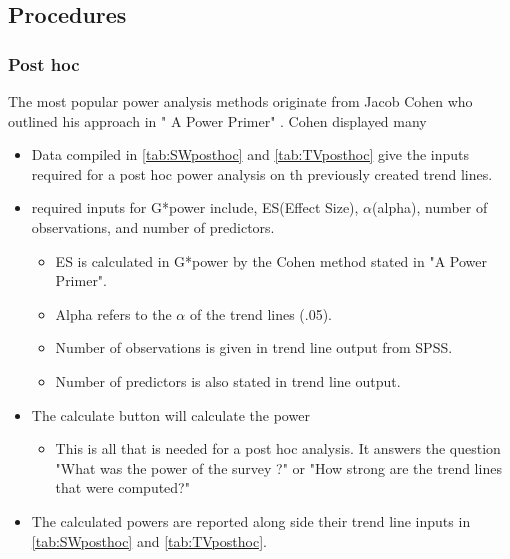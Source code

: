 \subsection{Procedures}
\subsubsection{Post hoc}

The most popular power analysis methods originate from Jacob Cohen who outlined his approach in " A Power Primer" \citep{cohen1992power}.
Cohen displayed many

\begin{itemize}
	\item Data compiled in \autoref{tab:SWposthoc} and \autoref{tab:TVposthoc} give the inputs required for a post hoc power analysis on th previously created trend lines.
	\item required inputs for G*power include, ES(Effect Size), $\alpha$(alpha), number of observations, and number of predictors.
	\begin{itemize}
		\item ES is calculated in G*power by the Cohen method stated in \citep{cohen1992power} "A Power Primer".
		\item Alpha refers to the $\alpha$ of the trend lines (.05).
		\item Number of observations is given in trend line output from SPSS.
		\item Number of predictors is also stated in trend line output.
	\end{itemize}
	\item The calculate button will calculate the power
	\begin{itemize}
		\item This is all that is needed for a post hoc analysis.  It answers the question "What was the power of the survey ?" or "How strong are the trend lines that were computed?"
	\end{itemize}
	\item The calculated powers are reported along side their trend line inputs in \autoref{tab:SWposthoc} and \autoref{tab:TVposthoc}.
\end{itemize}



